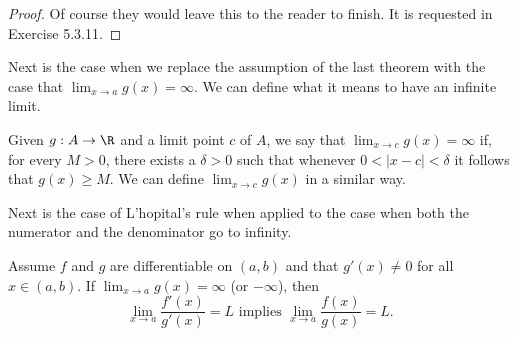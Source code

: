\begin{proof}
Of course they would leave this to the reader to finish. It is requested in Exercise 5.3.11.
\end{proof}

Next is the case when we replace the assumption of the last theorem with the case that \( \lim_{ x \to a } g(x) = \infty \). We can define what it means to have an infinite limit.

\begin{tcolorbox}
\begin{defn}
Given \( g: A \to \R \) and a limit point \( c  \) of \( A  \), we say that \( \lim_{ x \to c  } g(x) = \infty  \) if, for every \( M > 0  \), there exists a \( \delta > 0  \) such that whenever \( 0 < | x -c  |  < \delta  \) it follows that \( g(x) \geq M  \). We can define \( \lim_{ x \to c  } g(x)  \) in a similar way.
\end{defn}
\end{tcolorbox}
 
Next is the case of L'hopital's rule when applied to the case when both the numerator and the denominator go to infinity.

\begin{tcolorbox}
    \begin{thm}
    Assume \( f  \) and \( g  \) are differentiable on \( (a,b)  \) and that \( g'(x) \neq 0  \) for all \( x \in (a,b) \). If \( \lim_{ x \to a } g(x) = \infty  \) (or \( - \infty  \)), then 
    \[  \lim_{ x \to a } \frac{ f'(x)  }{ g'(x)  } = L \text{~implies~} \lim_{ x \to a } \frac{ f(x)  }{ g(x)  } = L. \]
    \end{thm}
\end{tcolorbox}

